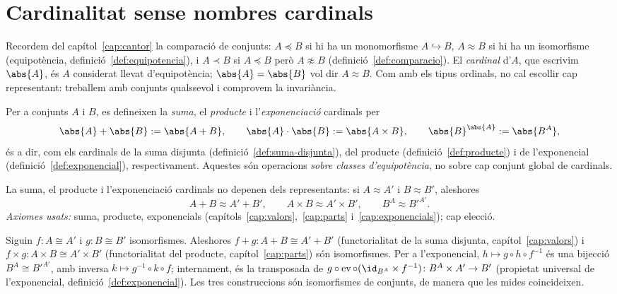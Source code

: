 \section{Cardinalitat sense nombres cardinals}\label{sec:cardinalitat-relacional}

Recordem del capítol~\ref{cap:cantor} la comparació de conjunts: \(A\preceq B\)
si hi ha un monomorfisme \(A\hookrightarrow B\), \(A\approx B\) si hi ha un
isomorfisme (equipotència, definició~\ref{def:equipotencia}), i \(A\prec B\)
si \(A\preceq B\) però \(A\not\approx B\) (definició~\ref{def:comparacio}). El
\emph{cardinal} d'\(A\), que escrivim \(\abs{A}\), és \(A\) considerat llevat
d'equipotència; \(\abs{A}=\abs{B}\) vol dir \(A\approx B\). Com amb els tipus
ordinals, no cal escollir cap representant: treballem amb conjunts qualssevol
i comprovem la invariància.

\begin{definicio}\label{def:operacions-cardinals}
Per a conjunts \(A\) i \(B\), es defineixen la \emph{suma}, el \emph{producte}
i l'\emph{exponenciació} cardinals per
\[
\abs{A}+\abs{B}:=\abs{A+B},
\qquad
\abs{A}\cdot\abs{B}:=\abs{A\times B},
\qquad
\abs{B}^{\abs{A}}:=\abs{B^{A}},
\]
és a dir, com els cardinals de la suma disjunta
(definició~\ref{def:suma-disjunta}), del producte
(definició~\ref{def:producte}) i de l'exponencial
(definició~\ref{def:exponencial}), respectivament. Aquestes són operacions
\emph{sobre classes d'equipotència}, no sobre cap conjunt global de cardinals.
\end{definicio}

\begin{proposicio}\label{prop:operacions-invariants}
La suma, el producte i l'exponenciació cardinals no depenen dels
representants: si \(A\approx A'\) i \(B\approx B'\), aleshores
\[
A+B\approx A'+B',
\qquad
A\times B\approx A'\times B',
\qquad
B^{A}\approx B'^{A'} .
\]
\emph{Axiomes usats:} suma, producte, exponencials
(capítols~\ref{cap:valors},~\ref{cap:parts} i~\ref{cap:exponencials}); cap
elecció.
\end{proposicio}

\begin{prova}
Siguin \(f\colon A\cong A'\) i \(g\colon B\cong B'\) isomorfismes. Aleshores
\(f+g\colon A+B\cong A'+B'\) (functorialitat de la suma disjunta,
capítol~\ref{cap:valors}) i \(f\times g\colon A\times B\cong A'\times B'\)
(functorialitat del producte, capítol~\ref{cap:parts}) són isomorfismes. Per a
l'exponencial, \(h\mapsto g\circ h\circ f^{-1}\) és una bijecció
\(B^{A}\cong B'^{A'}\), amb inversa \(k\mapsto g^{-1}\circ k\circ f\);
internament, és la transposada de
\(g\circ\operatorname{ev}\circ(\id_{B^A}\times f^{-1})\colon B^A\times A'\to B'\)
(propietat universal de l'exponencial, definició~\ref{def:exponencial}). Les
tres construccions són isomorfismes de conjunts, de manera que les mides
coincideixen.
\end{prova}

